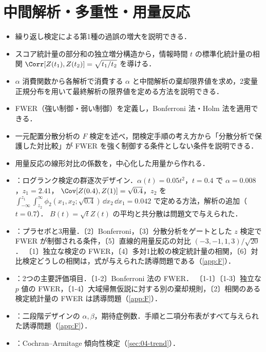 \chapter{中間解析・多重性・用量反応}\label{ch:14}

\begin{goalbox}
\begin{itemize}
\item 繰り返し検定による第1種の過誤の増大を説明できる．
\item スコア統計量の部分和の独立増分構造から，情報時間 $t$ の標準化統計量の相関 $\Corr[Z(t_1),Z(t_2)]=\sqrt{t_1/t_2}$ を導ける．
\item $\alpha$ 消費関数から各解析で消費する $\alpha$ と中間解析の棄却限界値を求め，2変量正規分布を用いて最終解析の限界値を定める方法を説明できる．
\item FWER（強い制御・弱い制御）を定義し，Bonferroni 法・Holm 法を適用できる．
\item 一元配置分散分析の $F$ 検定を述べ，閉検定手順の考え方から「分散分析で保護した対比較」が FWER を強く制御する条件としない条件を説明できる．
\item 用量反応の線形対比の係数を，中心化した用量から作れる．
\end{itemize}
\end{goalbox}

\begin{exambox}
\begin{itemize}
\item {}：ログランク検定の群逐次デザイン．$\alpha(t)=0.05t^2$，$t=0.4$ で $\alpha=0.008$，$z_1=2.41$，
      $\Cov[Z(0.4),Z(1)]=\sqrt{0.4}$，$z_2$ を $\int_{-\infty}^{z_1}\int_{z_2}^\infty\phi_2(x_1,x_2;\sqrt{0.4})\,\dd x_2\,\dd x_1=0.042$ で定める方法，解析の追加（$t=0.7$）．
      $B(t)=\sqrt tZ(t)$ の平均と共分散は問題文で与えられた．
\item {}：プラセボと3用量．〔2〕Bonferroni，〔3〕分散分析をゲートとした $z$ 検定で FWER が制御される条件，〔5〕直線的用量反応の対比 $(-3,-1,1,3)/\sqrt{20}$．
      〔1〕独立な検定の FWER，〔4〕多対1比較の検定統計量の相関，〔6〕対比検定どうしの相関は，式が与えられた誘導問題である（\cref{app:F}）．
\item {}：2つの主要評価項目．〔1-2〕Bonferroni 法の FWER．
      〔1-1〕〔1-3〕独立な $p$ 値の FWER，〔1-4〕大域帰無仮説に対する別の棄却規則，〔2〕相関のある検定統計量の FWER は誘導問題（\cref{app:F}）．
\item {}：二段階デザインの $\alpha,\beta$，期待症例数．手順と二項分布表がすべて与えられた誘導問題（\cref{app:F}）．
\item {}：Cochran--Armitage 傾向性検定（\cref{sec:04-trend}）．
\end{itemize}
\end{exambox}

